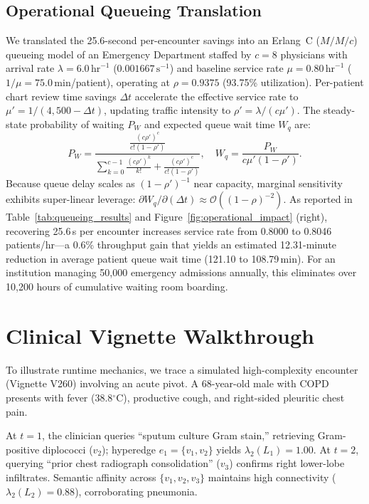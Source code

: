 \documentclass[10pt, onecolumn]{article}
\begin{document}
\subsection{Operational Queueing Translation}
We translated the 25.6-second per-encounter savings into an Erlang~C ($M/M/c$) queueing model of an Emergency Department staffed by $c = 8$ physicians with arrival rate $\lambda = 6.0\,\text{hr}^{-1}$ ($0.001667\,\text{s}^{-1}$) and baseline service rate $\mu = 0.80\,\text{hr}^{-1}$ ($1/\mu = 75.0$\,min/patient), operating at $\rho = 0.9375$ (93.75\% utilization). Per-patient chart review time savings $\Delta t$ accelerate the effective service rate to $\mu' = 1 / (4{,}500 - \Delta t)$, updating traffic intensity to $\rho' = \lambda / (c \mu')$. The steady-state probability of waiting $P_W$ and expected queue wait time $W_q$ are:
\begin{equation}
  P_W = \frac{\frac{(c \rho')^c}{c!(1-\rho')}}{\sum_{k=0}^{c-1} \frac{(c \rho')^k}{k!} + \frac{(c \rho')^c}{c!(1-\rho')}}, \quad W_q = \frac{P_W}{c \mu' (1 - \rho')}.
  \label{eq:erlang_c}
\end{equation}
Because queue delay scales as $(1-\rho')^{-1}$ near capacity, marginal sensitivity exhibits super-linear leverage: $\partial W_q / \partial(\Delta t) \approx \mathcal{O}((1-\rho)^{-2})$. As reported in Table~\ref{tab:queueing_results} and Figure~\ref{fig:operational_impact} (right), recovering 25.6\,s per encounter increases service rate from 0.8000 to 0.8046\,patients/hr—a 0.6\% throughput gain that yields an estimated 12.31-minute reduction in average patient queue wait time (121.10 to 108.79\,min). For an institution managing 50{,}000 emergency admissions annually, this eliminates over 10{,}200 hours of cumulative waiting room boarding.

\section{Clinical Vignette Walkthrough}
\label{sec:case_study}

To illustrate runtime mechanics, we trace a simulated high-complexity encounter (Vignette V260) involving an acute pivot. A 68-year-old male with COPD presents with fever (38.8$^\circ$C), productive cough, and right-sided pleuritic chest pain.

At $t=1$, the clinician queries ``sputum culture Gram stain,'' retrieving Gram-positive diplococci ($v_2$); hyperedge $e_1 = \{v_1, v_2\}$ yields $\lambda_2(L_1) = 1.00$. At $t=2$, querying ``prior chest radiograph consolidation'' ($v_3$) confirms right lower-lobe infiltrates. Semantic affinity across $\{v_1, v_2, v_3\}$ maintains high connectivity ($\lambda_2(L_2) = 0.88$), corroborating pneumonia.
\end{document}
